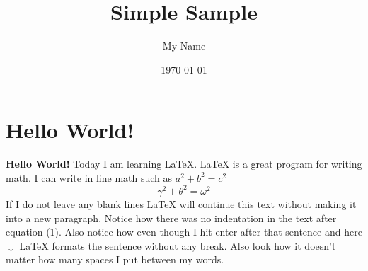 \documentclass{article}
\title{Simple Sample}
\author{My Name}
\date{\today}
\begin{document}
    \maketitle

    \section{Hello World!}

    \textbf{Hello World!} Today I am learning \LaTeX.
    \LaTeX{} is a great program for writing math. I can write in line math such as $a^2+b^2=c^2$
    \begin{equation}
    \gamma^2+\theta^2=\omega^2
    \end{equation}
    If I do not leave any blank lines \LaTeX{} will continue  this text without making it into a new paragraph.  Notice how there was no indentation in the text after equation (1).
    Also notice how even though I hit enter after that sentence and here $\downarrow$
    \LaTeX{} formats the sentence without any break.  Also   look  how      it   doesn't     matter          how    many  spaces     I put     between       my    words.
\end{document}
